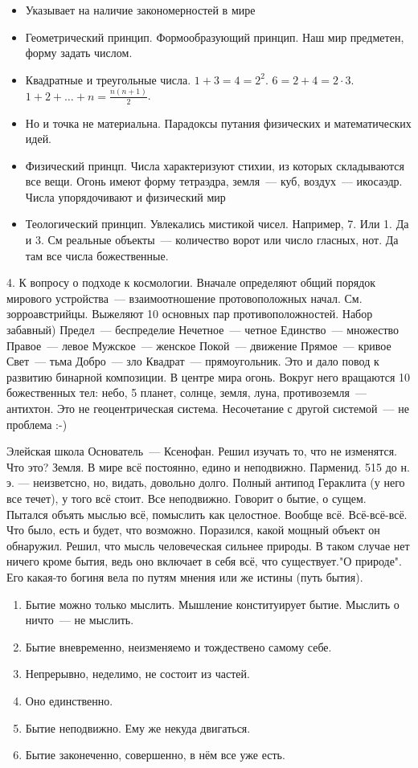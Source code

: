 \begin{itemize}
	\item Указывает на наличие закономерностей в мире
	\item Геометрический принцип. Формообразующий принцип. Наш мир предметен, форму задать числом. 
	\item Квадратные и треугольные числа. $1+3=4=2^2$. $6=2+4=2\cdot3$. $1+2+\ldots+n=\frac{n(n+1)}2$. 
	\item Но и точка не материальна. Парадоксы путания физических и математических идей. 
	\item Физический принцп. Числа характеризуют стихии, из которых складываются все вещи. Огонь имеют форму тетраэдра, земля~--- куб, воздух~--- икосаэдр. Числа упорядочивают и физический мир
	\item Теологический принцип. Увлекались мистикой чисел. Например, 7. Или 1. Да и 3. См реальные объекты~--- количество ворот или число гласных, нот. Да там все числа божественные. 
\end{itemize}

4. К вопросу о подходе к космологии. Вначале определяют общий порядок мирового устройства~--- взаимоотношение протовоположных начал. См. зорроавстрийцы. Выжеляют 10 основных пар противоположностей. Набор забавный) 
Предел~--- беспределие
Нечетное~--- четное
Единство~--- множество
Правое~--- левое
Мужское~--- женское
Покой~--- движение
Прямое~--- кривое
Свет~--- тьма
Добро~--- зло
Квадрат~--- прямоугольник. 
Это и дало повод к развитию бинарной композиции. 
В центре мира огонь. Вокруг него вращаются 10 божественных тел: небо, 5 планет, солнце, земля, луна, противоземля~--- антихтон. Это не геоцентрическая система. Несочетание с другой системой~--- не проблема :-) 

Элейская школа
Основатель~--- Ксенофан. Решил изучать то, что не изменятся. Что это? Земля. В мире всё постоянно, едино и неподвижно. 
Парменид. 515 до н. э. --- неизветсно, но, видать, довольно долго. Полный антипод Гераклита (у него все течет), у того всё стоит. Все неподвижно. Говорит о бытие, о сущем. 
Пытался объять мыслью всё, помыслить как целостное. Вообще всё. Всё-всё-всё. Что было, есть и будет, что возможно. Поразился, какой мощный объект он обнаружил. Решил, что мысль человеческая сильнее природы. 
В таком случае нет ничего кроме бытия, ведь оно включает в себя всё, что существует."О природе". Его какая-то богиня вела по путям мнения или же истины (путь бытия). 
\begin{enumerate}
	\item Бытие можно только мыслить. Мышление конституирует бытие. Мыслить о ничто~--- не мыслить. 
	\item Бытие вневременно, неизменяемо и тождествено самому себе. 
	\item Непрерывно, неделимо, не состоит из частей. 
	\item Оно единственно. 
	\item Бытие неподвижно. Ему же некуда двигаться. 
	\item Бытие законеченно, совершенно, в нём все уже есть. 
\end{enumerate}


